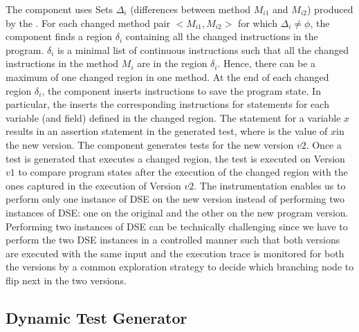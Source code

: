The  component uses Sets $\Delta_i$ (differences between method $M_{i1}$ and $M_{i2}$) produced by the . For each changed method pair $<M_{i1}, M_{i2}>$ for which $\Delta_i \neq \phi$, the  component finds a region $\delta_i$ containing all the changed instructions in the program. $\delta_i$ is a minimal list of continuous instructions such that all the changed instructions in the method $M_i$ are in the region $\delta_i$. Hence, there can be a maximum of one changed region in one method. At the end of each changed region $\delta_i$, the  component inserts instructions to save the program state. In particular, the  inserts the corresponding instructions for  statements for each variable (and field) defined in the changed region.
The  statement for a variable $x$ results in an assertion statement  in the generated test, where  is the value of $x$in the new version.
The  component generates tests for the new version $v2$.
Once a test is generated that executes a changed region, 
the test is executed on Version $v1$ 
to compare program states after the execution of the changed region
with the ones captured in the execution of Version $v2$. The instrumentation enables us to perform only one instance of DSE on the new version instead of performing two instances of DSE: one on the original and the other on the new program version. Performing two instances of DSE can be technically challenging since we have to perform the two DSE instances in a controlled manner such that both versions are executed  with the same input and the execution trace is monitored for both the versions by a common exploration strategy to decide which branching node to flip next in the two versions.



\subsection{Dynamic Test Generator}

